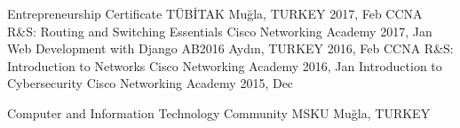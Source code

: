 \begin{cvhonors}
    \cvhonor
        {Entrepreneurship Certificate}
        {TÜBİTAK}
        {Muğla, TURKEY}
        {2017, Feb}
    \cvhonor
        {CCNA R\&S: Routing and Switching Essentials}
        {Cisco Networking Academy}
        {}
        {2017, Jan}
    \cvhonor
        {Web Development with Django}
        {AB2016}
        {Aydın, TURKEY}
        {2016, Feb}
    \cvhonor
        {CCNA R\&S: Introduction to Networks}
        {Cisco Networking Academy}
        {}
        {2016, Jan}
    \cvhonor
        {Introduction to Cybersecurity}
        {Cisco Networking Academy}
        {}
        {2015, Dec}
\end{cvhonors}

\begin{cvhonors}
    \cvhonor
        {Computer and Information Technology Community}
        {MSKU}
        {Muğla, TURKEY}
        {}

\end{cvhonors}
